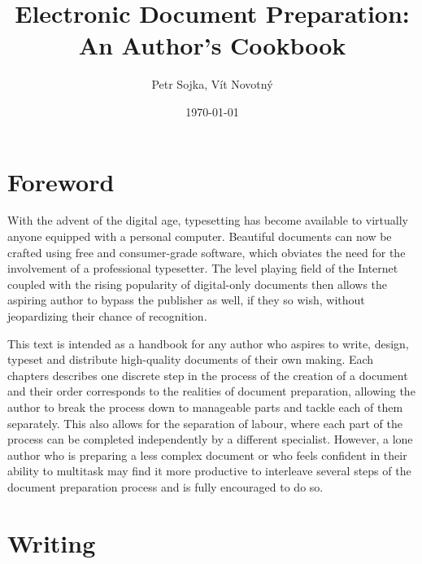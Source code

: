\documentclass[b5paper]{book}
\title{Electronic Document Preparation: An Author's Cookbook}
\author{Petr Sojka, Vít Novotný}
\date{\today}
\begin{document}
  \frontmatter
    \maketitle
    \tableofcontents
  \mainmatter
    \chapter{Foreword}
      With the advent of the digital age, typesetting has become available to
      virtually anyone equipped with a personal computer. Beautiful documents
      can now be crafted using free and consumer-grade software, which obviates
      the need for the involvement of a professional typesetter. The level
      playing field of the Internet coupled with the rising popularity of
      digital-only documents then allows the aspiring author to bypass the
      publisher as well, if they so wish, without jeopardizing their chance of
      recognition.
      
      This text is intended as a handbook for any author who aspires to write,
      design, typeset and distribute high-quality documents of their own making.
      Each chapters describes one discrete step in the process of the creation
      of a document and their order corresponds to the realities of document
      preparation, allowing the author to break the process down to manageable
      parts and tackle each of them separately. This also allows for the
      separation of labour, where each part of the process can be completed
      independently by a different specialist. However, a lone author who is
      preparing a less complex document or who feels confident in their ability
      to multitask may find it more productive to interleave several steps of
      the document preparation process and is fully encouraged to do so.

    \chapter{Writing}
\end{document}
